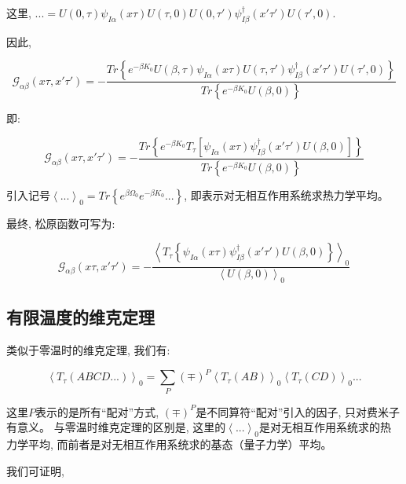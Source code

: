 这里, $... = U(0,\tau) \psi_{I\alpha}(x\tau)U(\tau,0)U(0,\tau')
\psi_{I\beta}^\dagger(x'\tau') U(\tau',0)$.

因此,

\begin{equation*}
\mathcal{ G }_{\alpha\beta}(x\tau,x'\tau') = - \frac{ Tr \left\{
 e^{-\beta K_0} U(\beta,\tau) \psi_{I \alpha}(x \tau) U (\tau,\tau') \psi_{I \beta}^\dagger (x'\tau')U(\tau',0)  \right\} }{Tr \left\{ e^{-\beta K_0} U(\beta,0) \right\} }
\end{equation*}

即:

\begin{equation*}
\mathcal{ G }_{\alpha\beta}(x\tau,x'\tau') = - \frac{ Tr \left\{
 e^{-\beta K_0} T_\tau \left[ \psi_{I \alpha}(x \tau) \psi_{I \beta}^\dagger (x'\tau') U(\beta,0) \right] \right\} }{Tr \left\{ e^{-\beta K_0} U(\beta,0) \right\} }
\end{equation*}


引入记号$\left\langle ... \right\rangle_0 = Tr \left\{ e^{\beta
\Omega_0} e^{-\beta K_0} ... \right\}$,
即表示对无相互作用系统求热力学平均。


最终, 松原函数可写为:

\begin{equation*}
\mathcal{ G }_{\alpha\beta}(x\tau,x'\tau') = - \frac{\left\langle
T_\tau \left\{ \psi_{I\alpha}(x\tau)\psi_{I\beta}^\dagger (x'\tau')
U(\beta,0) \right\} \right\rangle_0  }{ \left\langle U(\beta, 0)
\right\rangle_0 }
\end{equation*}


\subsection{有限温度的维克定理}

类似于零温时的维克定理, 我们有:

\begin{equation}\label{wick th at ft}
\left\langle T_\tau (ABCD...) \right\rangle_0 = \sum_P (\mp)^P
\left\langle T_\tau(AB) \right\rangle_0 \left\langle T_\tau(CD)
\right\rangle_0 ...
\end{equation}


这里$P$表示的是所有``配对''方式,
$(\mp)^P$是不同算符``配对''引入的因子, 只对费米子有意义。
与零温时维克定理的区别是, 这里的$\left\langle ...
\right\rangle_0$是对无相互作用系统求的热力学平均,
而前者是对无相互作用系统求的基态（量子力学）平均。

我们可证明,

